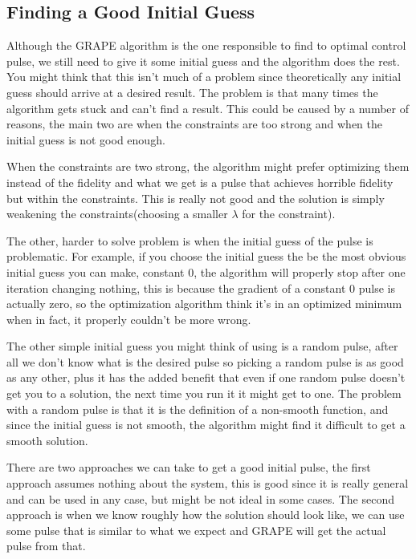 \documentclass[english, a4paper, 12pt, twoside]{article}
\numberwithin{equation}{section} %
\begin{document}

\subsection{Finding a Good Initial Guess}
Although the GRAPE algorithm is the one responsible to find to optimal control pulse, we still need to give it some initial guess and the algorithm does the rest. You might think that this isn't much of a problem since theoretically any initial guess should arrive at a desired result. The problem is that many times the algorithm gets stuck and can't find a result. This could be caused by a number of reasons, the main two are when the constraints are too strong and when the initial guess is not good enough.

When the constraints are two strong, the algorithm might prefer optimizing them instead of the fidelity and what we get is a pulse that achieves horrible fidelity but within the constraints. This is really not good and the solution is simply weakening the constraints(choosing a smaller $\lambda$ for the constraint).

The other, harder to solve problem is when the initial guess of the pulse is problematic. For example, if you choose the initial guess the be the most obvious initial guess you can make, constant 0, the algorithm will properly stop after one iteration changing nothing, this is because the gradient of a constant 0 pulse is actually zero, so the optimization algorithm think it's in an optimized minimum when in fact, it properly couldn't be more wrong.

The other simple initial guess you might think of using is a random pulse, after all we don't know what is the desired pulse so picking a random pulse is as good as any other, plus it has the added benefit that even if one random pulse doesn't get you to a solution, the next time you run it it might get to one. The problem with a random pulse is that it is the definition of a non-smooth function, and since the initial guess is not smooth, the algorithm might find it difficult to get a smooth solution.

There are two approaches we can take to get a good initial pulse, the first approach assumes nothing about the system, this is good since it is really general and can be used in any case, but might be not ideal in some cases. The second approach is when we know roughly how the solution should look like, we can use some pulse that is similar to what we expect and GRAPE will get the actual pulse from that.
\end{document}

